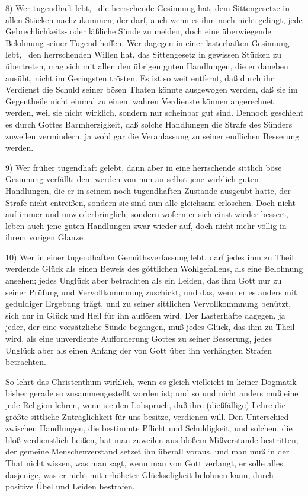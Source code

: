 {8) Wer tugendhaft lebt, \dh\  die herrschende Gesinnung hat, dem Sittengesetze in allen Stücken nachzukommen, der darf, auch wenn es ihm noch nicht gelingt, jede Gebrechlichkeits- oder läßliche Sünde zu meiden, doch eine überwiegende Belohnung seiner Tugend hoffen. Wer dagegen in einer lasterhaften Gesinnung lebt, \dh\  den herrschenden Willen hat, das Sittengesetz in gewissen Stücken zu übertreten, mag sich mit allen den übrigen guten Handlungen, die er daneben ausübt, nicht im Geringsten trösten. Es ist so weit entfernt, daß durch ihr Verdienst die Schuld seiner bösen Thaten könnte ausgewogen werden, daß sie im Gegentheile nicht einmal zu einem wahren Verdienste können angerechnet werden, weil sie nicht wirklich, sondern nur scheinbar gut sind. Dennoch geschieht es durch Gottes Barmherzigkeit, daß solche Handlungen die Strafe des Sünders zuweilen vermindern, ja wohl gar die Veranlassung zu seiner endlichen Besserung werden. \par
9) Wer früher tugendhaft gelebt, dann aber in eine herrschende sittlich böse Gesinnung verfällt: dem werden von nun an selbst jene wirklich guten Handlungen, die er in seinem noch tugendhaften Zustande ausgeübt hatte, der Strafe nicht entreißen, sondern sie sind nun alle gleichsam erloschen. Doch nicht auf immer und unwiederbringlich;  sondern wofern er sich einst wieder bessert, leben auch jene guten Handlungen zwar wieder auf, doch nicht mehr völlig in ihrem vorigen Glanze. \par
10) Wer in einer tugendhaften Gemüthsverfassung lebt, darf jedes ihm zu Theil werdende Glück als einen Beweis des göttlichen Wohlgefallens, als eine Belohnung ansehen; jedes Unglück aber betrachten als ein Leiden, das ihm Gott nur zu seiner Prüfung und Vervollkommnung zuschickt, und das, wenn er es anders mit geduldiger Ergebung trägt, und zu seiner sittlichen Vervollkommnung benützt, sich nur in Glück und Heil für ihn auflösen wird. Der Lasterhafte dagegen, ja jeder, der eine vorsätzliche Sünde begangen, muß jedes Glück, das ihm zu Theil wird, als eine unverdiente Aufforderung Gottes zu seiner Besserung, jedes Unglück aber als einen Anfang der von Gott über ihn verhängten Strafen betrachten.} \par
So lehrt das Christenthum wirklich, wenn es gleich vielleicht in keiner Dogmatik bisher gerade so zusammengestellt worden ist; und so und nicht anders muß eine jede Religion lehren, wenn sie den Lobspruch, daß ihre (dießfällige) Lehre die größte sittliche Zuträglichkeit für uns besitze, verdienen will. Den Unterschied zwischen Handlungen, die bestimmte Pflicht und Schuldigkeit, und solchen, die bloß verdienstlich heißen, hat man zuweilen aus bloßem Mißverstande bestritten; der gemeine Menschenverstand setzet ihn überall voraus, und man muß in der That nicht wissen, was man sagt, wenn man von Gott verlangt, er solle alles dasjenige, was er nicht mit erhöheter Glückseligkeit belohnen kann, durch positive Übel und Leiden bestrafen. \par
